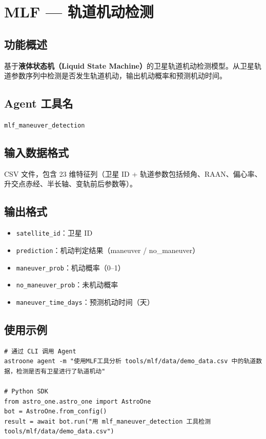 \documentclass[12pt,a4paper,UTF8]{ctexart}
\begin{document}
\section{MLF — 轨道机动检测}

\subsection{功能概述}
基于\textbf{液体状态机（Liquid State Machine）}的卫星轨道机动检测模型。从卫星轨道参数序列中检测是否发生轨道机动，输出机动概率和预测机动时间。

\subsection{Agent 工具名}
\texttt{mlf\_maneuver\_detection}

\subsection{输入数据格式}
CSV 文件，包含 23 维特征列（卫星 ID + 轨道参数包括倾角、RAAN、偏心率、升交点赤经、半长轴、变轨前后参数等）。

\subsection{输出格式}
\begin{itemize}
    \item \texttt{satellite\_id}：卫星 ID
    \item \texttt{prediction}：机动判定结果（maneuver / no\_maneuver）
    \item \texttt{maneuver\_prob}：机动概率（0–1）
    \item \texttt{no\_maneuver\_prob}：未机动概率
    \item \texttt{maneuver\_time\_days}：预测机动时间（天）
\end{itemize}

\subsection{使用示例}

\begin{verbatim}
# 通过 CLI 调用 Agent
astroone agent -m "使用MLF工具分析 tools/mlf/data/demo_data.csv 中的轨道数据，检测是否有卫星进行了轨道机动"

# Python SDK
from astro_one.astro_one import AstroOne
bot = AstroOne.from_config()
result = await bot.run("用 mlf_maneuver_detection 工具检测 tools/mlf/data/demo_data.csv")
\end{verbatim}
\end{document}
